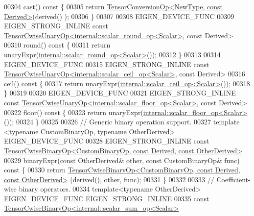 \begin{DoxyCode}
00304     cast()\textcolor{keyword}{ const }\{
00305       \textcolor{keywordflow}{return} \hyperlink{class_eigen_1_1_tensor_conversion_op}{TensorConversionOp<NewType, const Derived>}(derived()
      );
00306     \}
00307 
00308     EIGEN\_DEVICE\_FUNC
00309     EIGEN\_STRONG\_INLINE \textcolor{keyword}{const} 
      \hyperlink{class_eigen_1_1_tensor_cwise_unary_op}{TensorCwiseUnaryOp<internal::scalar\_round\_op<Scalar>}, \textcolor{keyword}{
      const} Derived>
00310     round()\textcolor{keyword}{ const }\{
00311       \textcolor{keywordflow}{return} unaryExpr(\hyperlink{struct_eigen_1_1internal_1_1scalar__round__op}{internal::scalar\_round\_op<Scalar>}());
00312     \}
00313 
00314     EIGEN\_DEVICE\_FUNC
00315     EIGEN\_STRONG\_INLINE \textcolor{keyword}{const} 
      \hyperlink{class_eigen_1_1_tensor_cwise_unary_op}{TensorCwiseUnaryOp<internal::scalar\_ceil\_op<Scalar>}, \textcolor{keyword}{
      const} Derived>
00316     ceil()\textcolor{keyword}{ const }\{
00317       \textcolor{keywordflow}{return} unaryExpr(\hyperlink{struct_eigen_1_1internal_1_1scalar__ceil__op}{internal::scalar\_ceil\_op<Scalar>}());
00318     \}
00319 
00320     EIGEN\_DEVICE\_FUNC
00321     EIGEN\_STRONG\_INLINE \textcolor{keyword}{const} 
      \hyperlink{class_eigen_1_1_tensor_cwise_unary_op}{TensorCwiseUnaryOp<internal::scalar\_floor\_op<Scalar>}, \textcolor{keyword}{
      const} Derived>
00322     floor()\textcolor{keyword}{ const }\{
00323       \textcolor{keywordflow}{return} unaryExpr(\hyperlink{struct_eigen_1_1internal_1_1scalar__floor__op}{internal::scalar\_floor\_op<Scalar>}());
00324     \}
00325 
00326     \textcolor{comment}{// Generic binary operation support.}
00327     \textcolor{keyword}{template} <\textcolor{keyword}{typename} CustomBinaryOp, \textcolor{keyword}{typename} OtherDerived> EIGEN\_DEVICE\_FUNC
00328     EIGEN\_STRONG\_INLINE \textcolor{keyword}{const} 
      \hyperlink{class_eigen_1_1_tensor_cwise_binary_op}{TensorCwiseBinaryOp<CustomBinaryOp, const Derived, const OtherDerived>}
00329     binaryExpr(\textcolor{keyword}{const} OtherDerived& other, \textcolor{keyword}{const} CustomBinaryOp& func)\textcolor{keyword}{ const }\{
00330       \textcolor{keywordflow}{return} 
      \hyperlink{class_eigen_1_1_tensor_cwise_binary_op}{TensorCwiseBinaryOp<CustomBinaryOp, const Derived, const OtherDerived>}
      (derived(), other, func);
00331     \}
00332 
00333     \textcolor{comment}{// Coefficient-wise binary operators.}
00334     \textcolor{keyword}{template}<\textcolor{keyword}{typename} OtherDerived> EIGEN\_DEVICE\_FUNC EIGEN\_STRONG\_INLINE
00335     \textcolor{keyword}{const} \hyperlink{class_eigen_1_1_tensor_cwise_binary_op}{TensorCwiseBinaryOp<internal::scalar\_sum\_op<Scalar>}

\end{DoxyCode}

